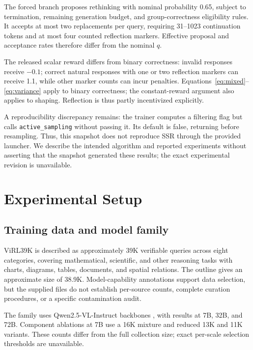 \documentclass[twocolumn]{article}
\begin{document}
The forced branch proposes rethinking with nominal probability 0.65, subject to termination, remaining generation budget, and group-correctness eligibility rules. It accepts at most two replacements per query, requiring 31--1023 continuation tokens and at most four counted reflection markers. Effective proposal and acceptance rates therefore differ from the nominal $q$.

The released scalar reward differs from binary correctness: invalid responses receive $-0.1$; correct natural responses with one or two reflection markers can receive 1.1, while other marker counts can incur penalties. Equations~\ref{eq:mixed}--\ref{eq:variance} apply to binary correctness; the constant-reward argument also applies to shaping. Reflection is thus partly incentivized explicitly.

A reproducibility discrepancy remains: the trainer computes a filtering flag but calls \texttt{active\_sampling} without passing it. Its default is false, returning before resampling. Thus, this snapshot does not reproduce SSR through the provided launcher. We describe the intended algorithm and reported experiments without asserting that the snapshot generated these results; the exact experimental revision is unavailable.

\section{Experimental Setup}
\label{sec:setup}

\subsection{Training data and model family}

ViRL39K is described as approximately 39K verifiable queries across eight categories, covering mathematical, scientific, and other reasoning tasks with charts, diagrams, tables, documents, and spatial relations. The outline gives an approximate size of 38.9K. Model-capability annotations support data selection, but the supplied files do not establish per-source counts, complete curation procedures, or a specific contamination audit.

The family uses Qwen2.5-VL-Instruct backbones \citep{qwen2_5_vl}, with results at 7B, 32B, and 72B. Component ablations at 7B use a 16K mixture and reduced 13K and 11K variants. These counts differ from the full collection size; exact per-scale selection thresholds are unavailable.
\end{document}
